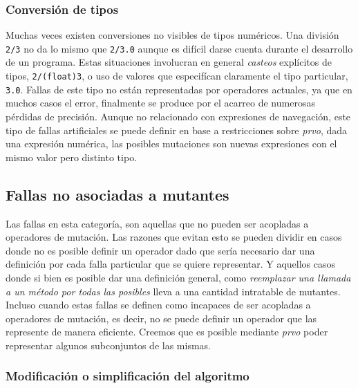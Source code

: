 \subsubsection{Conversi\'on de tipos}

Muchas veces existen conversiones no visibles de tipos num\'ericos. Una divisi\'on \texttt{2/3} no da lo mismo que \texttt{2/3.0} aunque es dif\'icil darse cuenta durante el desarrollo de un programa. Estas situaciones involucran en general \emph{casteos} expl\'icitos de tipos, \texttt{2/(float)3}, o uso de valores que especif\'ican claramente el tipo particular, \texttt{3.0}. Fallas de este tipo no est\'an representadas por operadores actuales, ya que en muchos casos el error, finalmente se produce por el acarreo de numerosas p\'erdidas de precisi\'on. Aunque no relacionado con expresiones de navegaci\'on, este tipo de fallas artificiales se puede definir en base a restricciones sobre \emph{prvo}, dada una expresi\'on num\'erica, las posibles mutaciones son nuevas expresiones con el mismo valor pero distinto tipo.

\subsection{Fallas no asociadas a mutantes}

Las fallas en esta categor\'ia, son aquellas que no pueden ser acopladas a operadores de mutaci\'on. Las razones que evitan esto se pueden dividir en casos donde no es posible definir un operador dado que ser\'ia necesario dar una definici\'on por cada falla particular que se quiere representar. Y aquellos casos donde si bien es posible dar una definici\'on general, como \emph{reemplazar una llamada a un m\'etodo por todas las posibles} lleva a una cantidad intratable de mutantes. Incluso cuando estas fallas se definen como incapaces de ser acopladas a operadores de mutaci\'on, es decir, no se puede definir un operador que las represente de manera eficiente. Creemos que es posible mediante \emph{prvo} poder representar algunos subconjuntos de las mismas.

\subsubsection{Modificaci\'on o simplificaci\'on del algoritmo}


